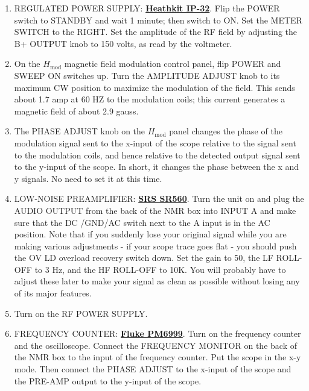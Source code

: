 \documentclass{../lab}
\begin{document}
\begin{enumerate}
    \item REGULATED POWER SUPPLY:    \href{https://berkeley-physics111b.github.io/assets/pdf/oldwebsitestructure/NMR/Equipment/Heathkit%20IP-32_Regulated%20Power%20Supply_Manual.pdf}{\textbf{Heathkit IP-32}}. Flip the POWER switch to STANDBY and wait 1 minute; then switch to ON. Set the METER SWITCH to the RIGHT. Set the amplitude of the RF field by adjusting the B+ OUTPUT knob to 150 volts, as read by the voltmeter.

    \item On the $H_\text{mod}$ magnetic field modulation control panel, flip POWER and SWEEP ON switches up. Turn the AMPLITUDE ADJUST knob to its maximum CW position to maximize the modulation of the field. This sends about 1.7 amp at 60 HZ to the modulation coils; this current generates a magnetic field of about 2.9 gauss.

    \item The PHASE ADJUST knob on the $H_\text{mod}$ panel changes the phase of the modulation signal sent to the x-input of the scope relative to the signal sent to the modulation coils, and hence relative to the detected output signal sent to the y-input of the scope. In short, it changes the phase between the x and y signals. No need to set it at this time.

    \item LOW-NOISE PREAMPLIFIER: \href{https://berkeley-physics111b.github.io/assets/pdf/oldwebsitestructure/General_Equipment/SRS%20SR560_Manual.pdf}{\textbf{SRS SR560}}. Turn the unit on and plug the AUDIO OUTPUT from the back of the NMR box into INPUT A and make sure that the DC /GND/AC switch next to the A input is in the AC position. Note that if you suddenly lose your original signal while you are making various adjustments - if your scope trace goes flat - you should push the OV LD overload recovery switch down. Set the gain to 50, the LF ROLL-OFF to 3 Hz, and the HF ROLL-OFF to 10K. You will probably have to adjust these later to make your signal as clean as possible without losing any of its major features.

    \item Turn on the RF POWER SUPPLY. 

    \item FREQUENCY COUNTER:    \href{https://berkeley-physics111b.github.io/assets/pdf/oldwebsitestructure/General_Equipment/Fluke%20PM6669_Manual.pdf}{\textbf{Fluke PM6999}}. Turn on the frequency counter and the oscilloscope. Connect the FREQUENCY MONITOR on the back of the NMR box to the input of the frequency counter. Put the scope in the x-y mode. Then connect the PHASE ADJUST to the x-input of the scope and the PRE-AMP output to the y-input of the scope.


\end{enumerate}
\end{document}
